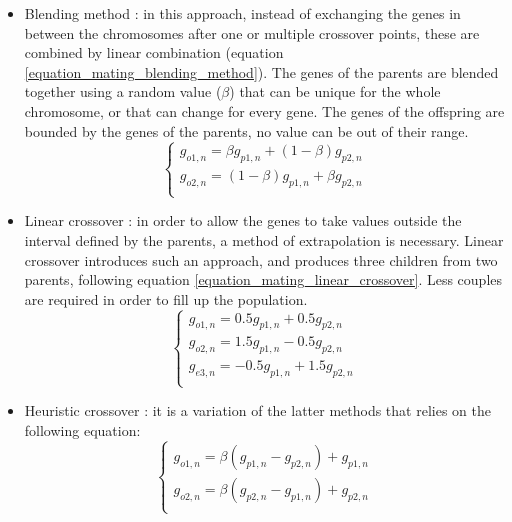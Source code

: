 \documentclass[twocol]{ametsoc}
\begin{document}
\begin{itemize}
	\item Blending method \citep{Radcliffe1991a}: in this approach, instead of exchanging the genes in between the chromosomes after one or multiple crossover points, these are combined by linear combination (equation \ref{equation_mating_blending_method}). The genes of the parents are blended together using a random value ($\beta$) that can be unique for the whole chromosome, or that can change for every gene. The genes of the offspring are bounded by the genes of the parents, no value can be out of their range.
	\begin{equation}
	\left\lbrace \begin{array}{l} 
	g_{o1,n} = \beta g_{p1,n} + (1-\beta)g_{p2,n} \\ 
	g_{o2,n} = (1-\beta) g_{p1,n} + \beta g_{p2,n} \\
	\end{array} \right.
	\label{equation_mating_blending_method}
	\end{equation}
	
	\item Linear crossover \citep{Wright1991a}: in order to allow the genes to take values outside the interval defined by the parents, a method of extrapolation is necessary. Linear crossover introduces such an approach, and produces three children from two parents, following equation \ref{equation_mating_linear_crossover}. Less couples are required in order to fill up the population.
	\begin{equation}
	\left\lbrace \begin{array}{l} 
	g_{o1,n} = 0.5 g_{p1,n} + 0.5 g_{p2,n} \\ 
	g_{o2,n} = 1.5 g_{p1,n} - 0.5 g_{p2,n} \\ 
	g_{e3,n} = - 0.5 g_{p1,n} + 1.5 g_{p2,n} \\ 
	\end{array} \right.
	\label{equation_mating_linear_crossover}
	\end{equation}
	
	\item Heuristic crossover \citep{Michalewicz1996}: it is a variation of the latter methods that relies on the following equation:
	\begin{equation}
	\left\lbrace \begin{array}{l} 
	g_{o1,n} = \beta (g_{p1,n} - g_{p2,n}) + g_{p1,n} \\
	g_{o2,n} = \beta (g_{p2,n} - g_{p1,n}) + g_{p2,n} \\
	\end{array} \right.
	\label{equation_mating_heuristic_crossover}
	\end{equation}
	

\end{itemize}
\end{document}
